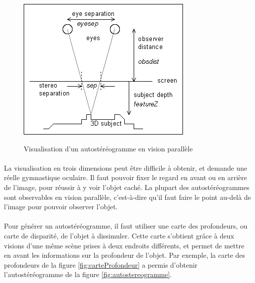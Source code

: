 \begin{figure}[h!]
  \centering
  \includegraphics{./ppe_autostereogramme.png}
  \label{fig:ppe_autostereogramme}
  \caption{Visualisation d’un autostéréogramme en vision parallèle \protect \footnotemark }
\end{figure}

\paragraph{}
La visualisation en trois dimensions peut être difficile à obtenir, et demande une réelle gymnastique oculaire. Il faut pouvoir fixer le regard en avant ou en arrière de l’image, pour réussir à y voir l’objet caché. La plupart des autostéréogrammes sont observables en vision parallèle, c'est-à-dire qu'il faut faire le point au-delà de l'image pour pouvoir observer l'objet.

\paragraph{}
	Pour générer un autostéréogramme, il faut utiliser une carte des profondeurs, ou carte de disparité, de l’objet à dissimuler. Cette carte s’obtient grâce à deux visions d’une même scène prises à deux endroits différents, et permet de mettre en avant les informations sur la profondeur de l’objet. Par exemple, la carte des profondeurs de la figure \ref{fig:carteProfondeur} a permis d’obtenir l’autostéréogramme de la figure \ref{fig:autostereogramme}.

